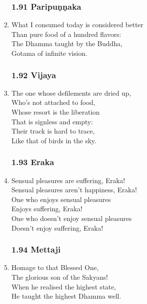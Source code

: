 \documentclass[10pt, openany]{book}
\begin{document}
\begin{enumerate}
\subsubsection*{1.91 Paripuṇṇaka}

\item What I consumed today is considered better\\
Than pure food of a hundred flavors:\\
The Dhamma taught by the Buddha,\\
Gotama of infinite vision.

\subsubsection*{1.92 Vijaya}

\item The one whose defilements are dried up,\\
Who’s not attached to food,\\
Whose resort is the liberation\\
That is signless and empty:\\
Their track is hard to trace,\\
Like that of birds in the sky.

\subsubsection*{1.93 Eraka}

\item Sensual pleasures are suffering, Eraka!\\
Sensual pleasures aren’t happiness, Eraka!\\
One who enjoys sensual pleasures \\
Enjoys suffering, Eraka!\\
One who doesn’t enjoy sensual pleasures \\
Doesn’t enjoy suffering, Eraka!

\subsubsection*{1.94 Mettaji}

\item Homage to that Blessed One,\\
The glorious son of the Sakyans!\\
When he realised the highest state,\\
He taught the highest Dhamma well.


\end{enumerate}
\end{document}
